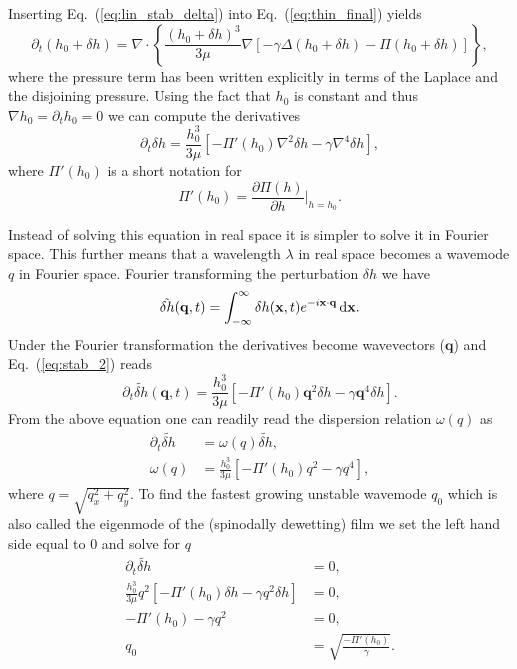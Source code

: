 Inserting Eq.~(\ref{eq:lin_stab_delta}) into Eq.~(\ref{eq:thin_final}) yields
\begin{equation}\label{eq:stab_1}
    \partial_t (h_0 + \delta h) = \nabla\cdot\left\{\frac{(h_0 + \delta h)^3}{3\mu}\nabla [-\gamma\Delta(h_0 + \delta h) - \Pi(h_0 + \delta h)]\right\},
\end{equation}
where the pressure term has been written explicitly in terms of the Laplace and the disjoining pressure.
Using the fact that $h_0$ is constant and thus $\nabla h_0 = \partial_t h_0= 0$ we can compute the derivatives
\begin{equation}\label{eq:stab_2}
    \partial_t \delta h = \frac{h_0^3}{3\mu}\left[-\Pi'(h_0)\nabla^2\delta h -\gamma\nabla^4\delta h\right],
\end{equation}
where $\Pi'(h_0)$ is a short notation for
\begin{equation}\label{eq:deriva_Pi}
    \Pi'(h_0) = \frac{\partial\Pi(h)}{\partial h}\bigg\rvert_{h=h_0}.
\end{equation}

Instead of solving this equation in real space it is simpler to solve it in Fourier space.
This further means that a wavelength $\lambda$ in real space becomes a wavemode $q$ in Fourier space. 
Fourier transforming the perturbation $\delta h$ we have 
\begin{equation}\label{eq:fourier_h}
    \tilde{\delta h}(\mathbf{q},t) = \int_{-\infty}^{\infty} \delta h(\mathbf{x},t) e^{-i\mathbf{x}\cdot\mathbf{q}} \mathop{}\!\mathrm{d}\mathbf{x}.    
\end{equation}
Under the Fourier transformation the derivatives become wavevectors ($\mathbf{q}$) and Eq.~(\ref{eq:stab_2}) reads
\begin{equation}\label{eq:stab_3}
    \partial_t \tilde{\delta h}(\mathbf{q},t) = \frac{h_0^3}{3\mu}\left[-\Pi'(h_0)\mathbf{q}^2\delta h -\gamma\mathbf{q}^4\delta h\right].
\end{equation}
From the above equation one can readily read the dispersion relation $\omega(q)$ as 
\begin{align}
    \partial_t \tilde{\delta h} &= \omega(q)\tilde{\delta h}, \\
    \omega(q) &= \frac{h_0^3}{3\mu}\left[-\Pi'(h_0)q^2 -\gamma q^4\right], 
\end{align}
where $q = \sqrt{q_x^2 + q_y^2}$.
To find the fastest growing unstable wavemode $q_0$ which is also called the eigenmode of the (spinodally dewetting) film we set the left hand side equal to $0$ and solve for $q$
\begin{align}\label{eq:stab_4}
    \partial_t \tilde{\delta h} &= 0, \\
    \frac{h_0^3}{3\mu}q^2\left[-\Pi'(h_0)\delta h -\gamma q^2\delta h\right] &= 0, \\
    -\Pi'(h_0) -\gamma q^2 &= 0, \\
    q_0 &= \sqrt{\frac{-\Pi'(h_0)}{\gamma}} .
\end{align}

